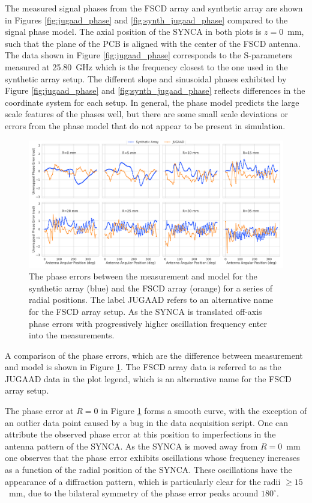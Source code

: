 The measured signal phases from the FSCD array and synthetic array are shown in Figures \ref{fig:jugaad_phase} and \ref{fig:synth_jugaad_phase} compared to the signal phase model. The axial position of the SYNCA in both plots is $z=0$~mm, such that the plane of the PCB is aligned with the center of the FSCD antenna. The data shown in Figure \ref{fig:jugaad_phase} corresponds to the S-parameters measured at 25.80~GHz which is the frequency closest to the one used in the synthetic array setup. The different slope and sinusoidal phases exhibited by Figure \ref{fig:jugaad_phase} and \ref{fig:synth_jugaad_phase} reflects differences in the coordinate system for each setup. In general, the phase model predicts the large scale features of the phases well, but there are some small scale deviations or errors from the phase model that do not appear to be present in simulation. 

\begin{figure}[htbp]
    \centering
    \includegraphics[width=1\textwidth]{figs/Chapter-5/230414_synthetic_array_phase_error_curves_z0.png}
    \caption{The phase errors between the measurement and model for the synthetic array (blue) and the FSCD array (orange) for a series of radial positions. The label JUGAAD refers to an alternative name for the FSCD array setup. As the SYNCA is translated off-axis phase errors with progressively higher oscillation frequency enter into the measurements.}
    \label{fig:phase-error-curve-comp}
\end{figure}

A comparison of the phase errors, which are the difference between measurement and model is shown in Figure \ref{fig:phase-error-curve-comp}. The FSCD array data is referred to as the JUGAAD data in the plot legend, which is an alternative name for the FSCD array setup.

The phase error at $R=0$ in Figure \ref{fig:phase-error-curve-comp} forms a smooth curve, with the exception of an outlier data point caused by a bug in the data acquisition script. One can attribute the observed phase error at this position to imperfections in the antenna pattern of the SYNCA. As the SYNCA is moved away from $R=0$~mm one observes that the phase error exhibits oscillations whose frequency increases as a function of the radial position of the SYNCA. These oscillations have the appearance of a diffraction pattern, which is particularly clear for the radii $\geq15$~mm, due to the bilateral symmetry of the phase error peaks around $180^\circ$. 

